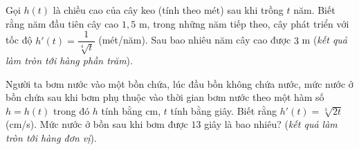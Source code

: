\begin{ex}
Gọi $h(t)$ là chiều cao của cây keo (tính theo mét) sau khi trồng $t$ năm. Biết rằng năm đầu tiên cây cao $1{,}5$ m, trong những năm tiếp theo, cây phát triển với tốc độ $h'(t)=\dfrac{1}{\sqrt[4]{t}}$ (mét/năm). Sau bao nhiêu năm cây cao được $3$ m (\textit{kết quả làm tròn tới hàng phần trăm}).
\end{ex}

\begin{ex}%
Người ta bơm nước vào một bồn chứa, lúc đầu bồn không chứa nước, mức nước ở bồn chứa sau khi bơm phụ thuộc vào thời gian bơm nước theo một hàm số $h=h(t)$ trong đó $h$ tính bằng cm, $t$ tính bằng giây. Biết rằng $h'(t)=\sqrt[3]{2t}$ (cm/s). Mức nước ở bồn sau khi bơm được $13$ giây là bao nhiêu? (\textit{kết quả làm tròn tới hàng đơn vị}).
\end{ex}

